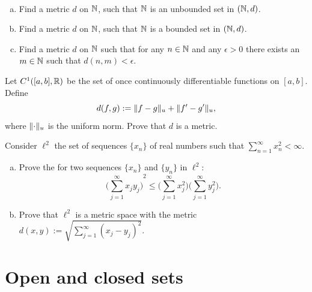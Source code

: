 \begin{exercise}
{\ }
\begin{enumerate}[a)]
\item
Find a metric $d$ on ${\mathbb{N}}$, such that ${\mathbb{N}}$ is an unbounded set in $({\mathbb{N}},d)$.
\item
Find a metric $d$ on ${\mathbb{N}}$, such that ${\mathbb{N}}$ is a bounded set in $({\mathbb{N}},d)$.
\item
Find a metric $d$ on ${\mathbb{N}}$ such that for any $n \in {\mathbb{N}}$ and any $\epsilon > 0$
there exists an $m \in {\mathbb{N}}$ such that $d(n,m) < \epsilon$.
\end{enumerate}
\end{exercise}

\begin{exercise} \label{exercise:C1ab}
Let $C^1([a,b],{\mathbb{R}})$ be the set of once continuously differentiable
functions on $[a,b]$.
Define
\begin{equation*}
d(f,g) := \lVert {f-g} \rVert_u + \lVert {f'-g'} \rVert_u,
\end{equation*}
where $\lVert {\cdot} \rVert_u$ is the uniform norm.  Prove that $d$ is a metric.
\end{exercise}

\begin{samepage}
\begin{exercise}
Consider $\ell^2$ the set of sequences $\{ x_n \}$
of real numbers
such that $\sum_{n=1}^\infty x_n^2 < \infty$.
\begin{enumerate}[a)]
\item
Prove the  for two sequences
$\{x_n \}$ and $\{ y_n \}$ in $\ell^2$:
\begin{equation*}
{\biggl( \sum_{j=1}^\infty x_j y_j \biggr)}^2
\leq
\biggl(\sum_{j=1}^\infty x_j^2 \biggr)
\biggl(\sum_{j=1}^\infty y_j^2 \biggr) .
\end{equation*}
\item
Prove that $\ell^2$ is a metric space with the metric
$d(x,y) := \sqrt{\sum_{j=1}^\infty {(x_j-y_j)}^2}$.
\end{enumerate}
\end{exercise}
\end{samepage}


\sectionnewpage
\section{Open and closed sets}
\label{sec:mettop}

